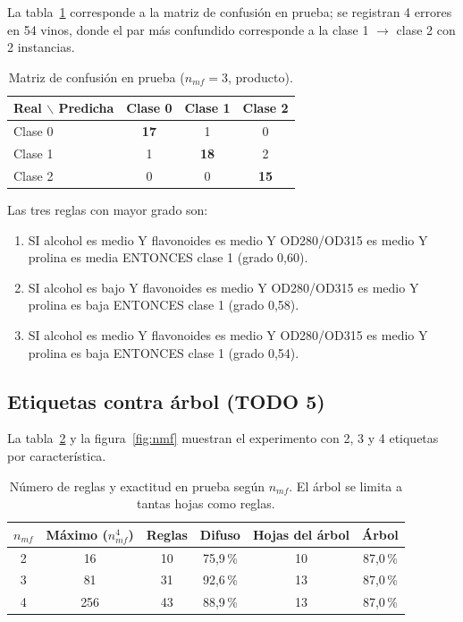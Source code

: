 \documentclass[11pt,letterpaper]{article}
\begin{document}
La tabla~\ref{tab:confusion} corresponde a la matriz de confusión en prueba; se registran 4 errores en 54 vinos, donde el par más confundido corresponde a la clase 1 $\to$ clase 2 con 2 instancias.

\begin{table}[H]
\centering
\caption{Matriz de confusión en prueba ($n_{mf}=3$, producto).}\label{tab:confusion}
\begin{tabular}{lccc}
\toprule
Real $\backslash$ Predicha & Clase 0 & Clase 1 & Clase 2 \\
\midrule
Clase 0 & \textbf{17} & 1 & 0 \\
Clase 1 & 1 & \textbf{18} & 2 \\
Clase 2 & 0 & 0 & \textbf{15} \\
\bottomrule
\end{tabular}
\end{table}

Las tres reglas con mayor grado son:
\begin{enumerate}
\item SI alcohol es medio Y flavonoides es medio Y OD280/OD315 es medio Y prolina es media ENTONCES clase 1 (grado 0,60).
\item SI alcohol es bajo Y flavonoides es medio Y OD280/OD315 es medio Y prolina es baja ENTONCES clase 1 (grado 0,58).
\item SI alcohol es medio Y flavonoides es medio Y OD280/OD315 es medio Y prolina es baja ENTONCES clase 1 (grado 0,54).
\end{enumerate}

\subsection{Etiquetas contra árbol (TODO 5)}

La tabla~\ref{tab:nmf} y la figura~\ref{fig:nmf} muestran el experimento con 2, 3 y 4 etiquetas por característica.

\begin{table}[H]
\centering
\caption{Número de reglas y exactitud en prueba según $n_{mf}$. El árbol se limita a tantas hojas como reglas.}\label{tab:nmf}
\begin{tabular}{cccccc}
\toprule
$n_{mf}$ & Máximo ($n_{mf}^4$) & Reglas & Difuso & Hojas del árbol & Árbol \\
\midrule
2 & 16 & 10 & 75,9\,\% & 10 & 87,0\,\% \\
3 & 81 & 31 & 92,6\,\% & 13 & 87,0\,\% \\
4 & 256 & 43 & 88,9\,\% & 13 & 87,0\,\% \\
\bottomrule
\end{tabular}
\end{table}
\end{document}
